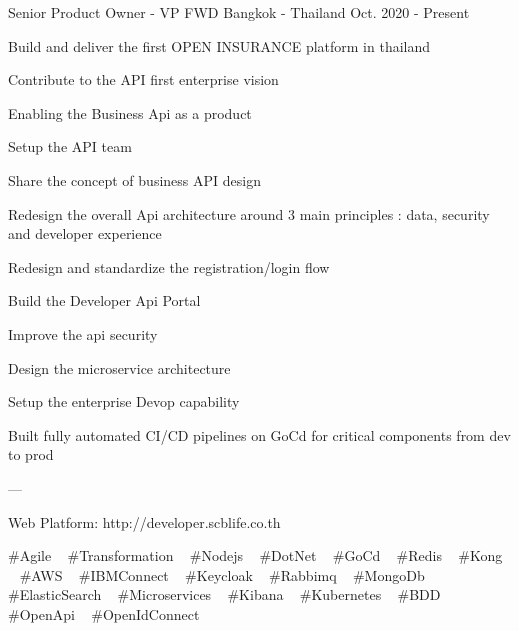 

\begin{cventries}

  \cventry
    {Senior Product Owner - VP} %
    {FWD} %
    {Bangkok - Thailand} %
    {Oct. 2020 - Present} %
    {
      \begin{cvitems} %
        \item {Build and deliver the first OPEN INSURANCE platform in thailand}
        \item {Contribute to the API first enterprise vision}
        \item {Enabling the Business Api as a product}
        \item {Setup the API team}
        \item {Share the concept of business API design}
        \item {Redesign the overall Api architecture around 3 main principles : data, security and developer experience}
        \item {Redesign and standardize the registration/login flow}
        \item {Build the Developer Api Portal}
        \item {Improve the api security}
        \item {Design the microservice architecture}
        \item {Setup the enterprise Devop capability}
        \item {Built fully automated CI/CD pipelines on GoCd for critical components from dev to prod}
        \item {---}
        \item {Web Platform: http://developer.scblife.co.th}
      \end{cvitems}
    }
    {
      \#Agile ~
      \#Transformation ~
      \#Nodejs ~
      \#DotNet ~
      \#GoCd ~
      \#Redis ~
      \#Kong ~
      \#AWS ~
      \#IBMConnect ~
      \#Keycloak ~
      \#Rabbimq ~
      \#MongoDb ~
      \#ElasticSearch ~
      \#Microservices ~
      \#Kibana ~
      \#Kubernetes ~
      \#BDD
      \#OpenApi ~
      \#OpenIdConnect ~
    }


\end{cventries}
